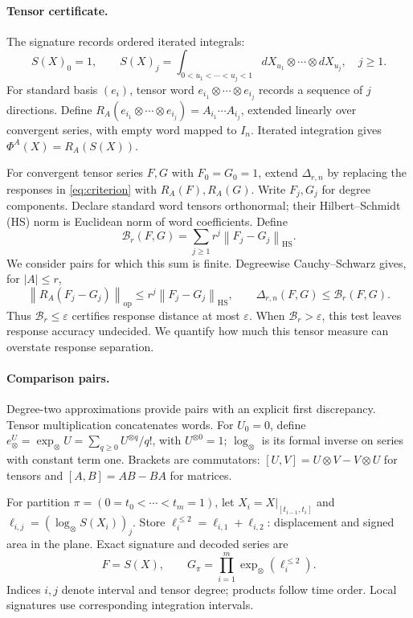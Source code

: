\documentclass[11pt,a4paper]{article}
\newcommand{\HS}{\mathrm{HS}}
\newcommand{\op}{\mathrm{op}}
\newcommand{\B}{\mathcal B}
\newcommand{\Del}{\Delta}
\newcommand{\norm}[1]{\left\lVert#1\right\rVert}
\begin{document}
\paragraph{Tensor certificate.}
The signature records ordered iterated integrals:
\[
 S(X)_0=1,\qquad S(X)_j=\int_{0<u_1<\cdots<u_j<1}
 dX_{u_1}\otimes\cdots\otimes dX_{u_j},\quad j\ge1.
\]
For standard basis \((e_i)\), tensor word
\(e_{i_1}\otimes\cdots\otimes e_{i_j}\) records a sequence of \(j\)
directions. Define
\(R_A(e_{i_1}\otimes\cdots\otimes e_{i_j})=A_{i_1}\cdots A_{i_j}\),
extended linearly over convergent series, with empty word mapped to \(I_n\).
Iterated integration gives \(\Phi^A(X)=R_A(S(X))\).

For convergent tensor series \(F,G\) with \(F_0=G_0=1\), extend
\(\Del_{r,n}\) by replacing the responses in \eqref{eq:criterion} with
\(R_A(F),R_A(G)\). Write \(F_j,G_j\) for degree components. Declare standard
word tensors orthonormal; their Hilbert--Schmidt (HS) norm is Euclidean norm
of word coefficients. Define
\begin{equation}\label{eq:certificate}
 \B_r(F,G)=\sum_{j\ge1}r^j\norm{F_j-G_j}_{\HS}.
\end{equation}
We consider pairs for which this sum is finite. Degreewise Cauchy--Schwarz
gives, for \(|A|\le r\),
\[
 \norm{R_A(F_j-G_j)}_{\op}\le r^j\norm{F_j-G_j}_{\HS},
 \qquad\Del_{r,n}(F,G)\le\B_r(F,G).
\]
Thus \(\B_r\le\varepsilon\) certifies response distance at most
\(\varepsilon\). When \(\B_r>\varepsilon\), this test leaves response
accuracy undecided. We quantify how much this tensor measure can overstate
response separation.

\paragraph{Comparison pairs.}
Degree-two approximations provide pairs with an explicit first discrepancy.
Tensor multiplication concatenates words. For \(U_0=0\), define
\(e_\otimes^U=\exp_\otimes U=\sum_{q\ge0}U^{\otimes q}/q!\), with
\(U^{\otimes0}=1\); \(\log_\otimes\) is its formal inverse on series with
constant term one. Brackets are commutators:
\([U,V]=U\otimes V-V\otimes U\) for tensors and \([A,B]=AB-BA\) for matrices.

For partition \(\pi=(0=t_0<\cdots<t_m=1)\), let
\(X_i=X|_{[t_{i-1},t_i]}\) and
\(\ell_{i,j}=(\log_\otimes S(X_i))_j\). Store
\(\ell_i^{\le2}=\ell_{i,1}+\ell_{i,2}\): displacement and signed area in
the plane. Exact signature and decoded series are
\[
 F=S(X),\qquad G_\pi=\prod_{i=1}^m\exp_\otimes(\ell_i^{\le2}).
\]
Indices \(i,j\) denote interval and tensor degree; products follow time order.
Local signatures use corresponding integration intervals.
\end{document}
